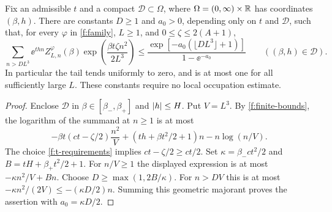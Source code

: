 \begin{lemma}\label{f:grand-tail}
Fix an admissible $t$ and a compact $\mathcal D\subset\Omega$, where
$\Omega=(0,\infty)\times\mathbb R$ has coordinates $(\beta,h)$.
There are constants $D\ge1$ and $a_0>0$, depending only on $t$ and
$\mathcal D$, such that, for every $\varphi$ in \eqref{f:family},
$L\ge1$, and $0\le\zeta\le2(A+1)$,
\begin{equation}\label{f:grand-tail-bound}
 \sum_{n>DL^3}\ee^{thn}Z^\varphi_{L,n}(\beta)
          \exp\left(\frac{\beta t\zeta n^2}{2L^3}\right)
 \le\frac{\exp[-a_0(\lfloor DL^3\rfloor+1)]}{1-\ee^{-a_0}}
 \qquad ((\beta,h)\in\mathcal D).
\end{equation}
In particular the tail tends uniformly to zero, and is at most one
for all sufficiently large $L$.  These constants require no local
occupation estimate.
\end{lemma}

\begin{proof}
Enclose $\mathcal D$ in $\beta\in[\beta_-,\beta_+]$ and
$\left|h\right|\le H$.  Put $V=L^3$.  By \eqref{f:finite-bounds}, the logarithm
of the summand at $n\ge1$ is at most
\[
 -\beta t(ct-\zeta/2)\frac{n^2}{V}
 +(th+\beta t^2/2+1)n-n\log(n/V).
\]
The choice \eqref{f:t-requirements} implies
$ct-\zeta/2\ge ct/2$.  Set
$\kappa=\beta_-ct^2/2$ and $B=tH+\beta_+t^2/2+1$.
For $n/V\ge1$ the displayed expression is at most
$-\kappa n^2/V+Bn$.  Choose $D\ge\max(1,2B/\kappa)$.
For $n>DV$ this is at most
$-\kappa n^2/(2V)\le-(\kappa D/2)n$.
Summing this geometric majorant proves the assertion with
$a_0=\kappa D/2$.
\end{proof}

